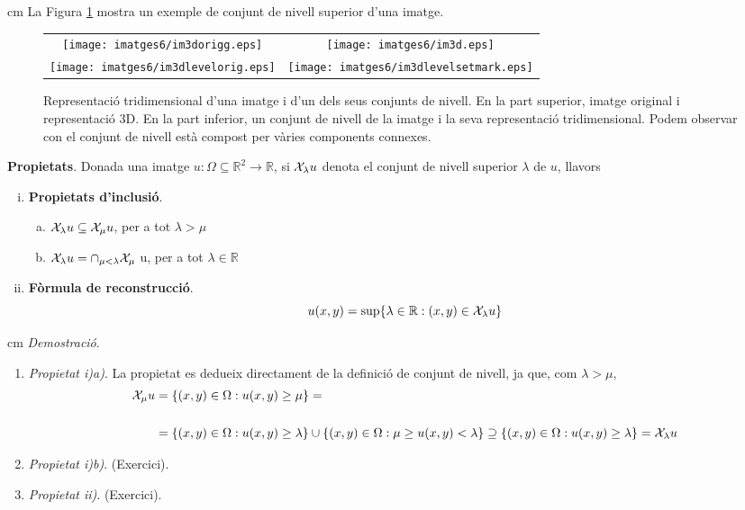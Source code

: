 \documentclass{article}
\def\R{\mathbb R}
\begin{document}
 cm
\noindent
La Figura \ref{levelset3D} mostra un exemple de conjunt de nivell superior d'una imatge.

\begin{figure}[htbp]
\begin{center}
\begin{tabular}{cc}
\texttt{[image: imatges6/im3dorigg.eps]} & 
\texttt{[image: imatges6/im3d.eps]} \\
\texttt{[image: imatges6/im3dlevelorig.eps]} & 
\texttt{[image: imatges6/im3dlevelsetmark.eps]} 
\end{tabular}
\end{center}
\caption{Representaci\'o tridimensional d'una imatge i d'un dels seus conjunts de nivell.
En la part superior, imatge original i representaci\'o 3D. En la part inferior, un conjunt de
nivell de la imatge i la seva representaci\'o tridimensional. Podem observar con el conjunt
de nivell est\`a compost per v\`aries components connexes.}
\label{levelset3D}
\end{figure}

\newpage
\noindent
{\bf Propietats}. Donada una imatge $u: \Omega \subseteq \R^2 \longrightarrow \R$, si 
${\cal X}_\lambda u$ denota el conjunt de nivell superior $\lambda$ de $u$, llavors
\begin{enumerate}[i)]
\item {\bf Propietats d'inclusi\'o}.
\begin{enumerate}[a)]
\item ${\cal X}_\lambda u \subseteq {\cal X}_\mu u$, per a tot $\lambda > \mu$
\item ${\cal X}_\lambda u =\cap_{\mu < \lambda} {\cal X}_\mu$ u, per a tot $\lambda \in \R$
\end{enumerate}
\item {\bf F\`ormula de reconstrucci\'o}. 
\begin{equation}
\label{levelsetreconst}
u(x, y)=\sup \{ \lambda \in \R : (x, y) \in {\cal X}_\lambda u \}
\end{equation}
\end{enumerate}

 cm
\noindent
{\it Demostraci\'o}. 
\begin{enumerate}
\item[] {\it Propietat i)a)}. La propietat es dedueix directament de la definici\'o de conjunt de nivell,
ja que, com $\lambda > \mu$, 
\[
\begin{split}
{\cal X}_\mu u & = \{ (x, y) \in \Omega : u(x, y) \geq \mu \} = \\ \\
& = \{ (x, y) \in \Omega : u(x, y) \geq \lambda \} \cup \{ (x, y) \in \Omega : \mu \geq u(x, y) < \lambda \} 
 \supseteq \{ (x, y) \in \Omega : u(x, y) \geq \lambda \} = {\cal X}_\lambda u
\end{split}
\]

\item[] {\it Propietat i)b)}. (Exercici).


\item[] {\it Propietat ii)}. (Exercici).

\end{enumerate}
\end{document}

